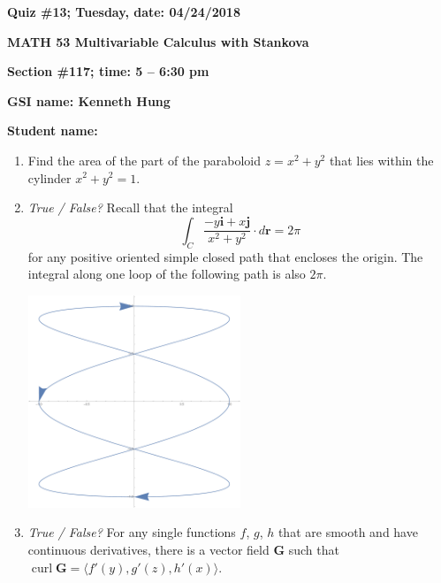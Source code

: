 \documentclass{article}
\newcommand{\rr}{\mathbf{r}}
\newcommand{\ii}{\mathbf{i}}
\newcommand{\jj}{\mathbf{j}}
\DeclareMathOperator{\curl}{curl}
\begin{document}
{\bf Quiz \#13; Tuesday, date: 04/24/2018}

{\bf MATH 53 Multivariable Calculus with Stankova}

{\bf Section \#117; time: 5 -- 6:30 pm}

{\bf GSI name: Kenneth Hung}

{\bf Student name:}

\vspace*{0.25in}

\begin{enumerate}
\item Find the area of the part of the paraboloid $z = x^2 + y^2$ that lies within the cylinder $x^2 + y^2 = 1$.

\item {\em True / False?} Recall that the integral
\[
\int_C \frac{-y \ii + x \jj}{x^2 + y^2} \cdot d\rr = 2\pi
\]
for any positive oriented simple closed path that encloses the origin. The integral along one loop of the following path is also $2\pi$.
\begin{center}
\includegraphics[width=0.5\textwidth]{quiz13dis117pic}
\end{center}

\item {\em True / False?} For any single functions $f$, $g$, $h$ that are smooth and have continuous derivatives, there is a vector field $\mathbf{G}$ such that $\curl \mathbf{G} = \langle f'(y), g'(z), h'(x) \rangle$.
\end{enumerate}
\end{document}
